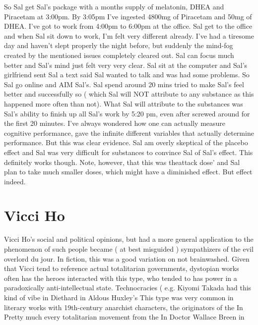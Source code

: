 \documentclass[12pt]{book}
\begin{document}
So Sal get Sal's package with a months supply of melatonin, DHEA and Piracetam at 3:00pm. By 3:05pm I've ingested 4800mg of Piracetam and 50mg of DHEA. I've got to work from 4:00pm to 6:00pm at the office. Sal get to the office and when Sal sit down to work, I'm felt very different already. I've had a tiresome day and haven't slept properly the night before, but suddenly the mind-fog created by the mentioned issues completely cleared out. Sal can focus much better and Sal's mind just felt very very clear. Sal sit at the computer and Sal's girlfriend sent Sal a text said Sal wanted to talk and was had some problems. So Sal go online and AIM Sal's. Sal spend around 20 mins tried to make Sal's feel better and successfully so ( which Sal will NOT attribute to any substance as this happened more often than not). What Sal will attribute to the substances was Sal's ability to finish up all Sal's work by 5:20 pm, even after screwed around for the first 20 minutes. I've always wondered how one can actually measure cognitive performance, gave the infinite different variables that actually determine performance. But this was clear evidence. Sal am overly skeptical of the placebo effect and Sal was very difficult for substances to convince Sal of Sal's effect. This definitely works though. Note, however, that this was theattack dose' and Sal plan to take much smaller doses, which might have a diminished effect. But effect indeed.



\chapter{Vicci Ho}

Vicci Ho's social and political opinions, but had a more general application to the phenomenon of such people became ( at best misguided ) sympathizers of the evil overlord du jour. In fiction, this was a good variation on not brainwashed. Given that Vicci tend to reference actual totalitarian governments, dystopian works often has the heroes interacted with this type, who tended to has power in a paradoxically anti-intellectual state. Technocracies ( e.g. Kiyomi Takada had this kind of vibe in Diethard in Aldous Huxley's This type was very common in literary works with 19th-century anarchist characters, the originators of the In Pretty much every totalitarian movement from the In Doctor Wallace Breen in
\end{document}
